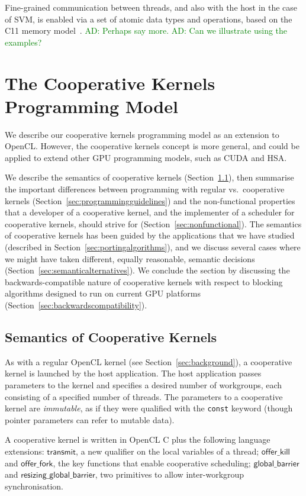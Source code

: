 \documentclass[nocopyrightspace,10pt]{sigplanconf}
\newcommand{\ADComment}[1]{\textcolor{green}{AD: #1}}
\newcommand{\transmit}{\mathsf{transmit}}
\newcommand{\offerfork}{\mathsf{offer\_fork}}
\newcommand{\offerkill}{\mathsf{offer\_kill}}
\newcommand{\globalbarrier}{\mathsf{global\_barrier}}
\newcommand{\resizingglobalbarrier}{\mathsf{resizing\_global\_barrier}}
\begin{document}
Fine-grained communication between threads, and also with the host in
the case of SVM, is enabled via a set of atomic data types and
operations, based on the C11 memory model~\cite{...}.
\ADComment{Perhaps say more.}  \ADComment{Can we illustrate using the
  examples?}


\section{The Cooperative Kernels Programming Model}\label{sec:cooperativekernels}

We describe our cooperative kernels programming model as an extension
to OpenCL.  However, the cooperative kernels concept is more general,
and could be applied to extend other GPU programming models, such as
CUDA and HSA.

We describe the semantics of cooperative kernels
(Section~\ref{sec:semantics}), then summarise the important
differences between programming with regular vs.\ cooperative kernels
(Section~\ref{sec:programmingguidelines}) and the non-functional
properties that a developer of a cooperative kernel, and the
implementer of a scheduler for cooperative kernels, should strive for
(Section~\ref{sec:nonfunctional}).  The semantics of cooperative
kernels has been guided by the applications that we have studied
(described in Section~\ref{sec:portingalgorithms}), and we discuss several cases where we
might have taken different, equally reasonable, semantic decisions (Section~\ref{sec:semanticalternatives}).
We conclude the section by discussing the backwards-compatible nature
of cooperative kernels with respect to blocking algorithms designed to
run on current GPU platforms
(Section~\ref{sec:backwardscompatibility}).

\subsection{Semantics of Cooperative Kernels}\label{sec:semantics}

As with a regular OpenCL kernel (see Section~\ref{sec:background}), a
cooperative kernel is launched by the host application.  The host
application passes parameters to the kernel and specifies a desired
number of workgroups, each consisting of a specified number of
threads.  The parameters to a cooperative kernel are \emph{immutable}, as if
they were qualified with the \texttt{const} keyword (though pointer
parameters can refer to mutable data).

A cooperative kernel is written in OpenCL C plus the following
language extensions: $\transmit$, a
new qualifier on the local variables of a thread; $\offerkill$ and
$\offerfork$, the key functions that enable cooperative scheduling;
$\globalbarrier$ and $\resizingglobalbarrier$, two primitives to allow
inter-workgroup synchronisation.
\end{document}
